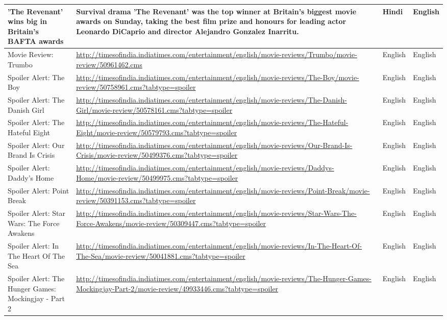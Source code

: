 \begin{itemize}
\begin{table}
\begin{center}
\begin{longtable}{|p{3cm}|p{7cm}|p{1.5cm}|p{1.5cm}|}
'The Revenant' wins big in Britain's BAFTA awards&  Survival drama 'The Revenant' was the top winner at Britain's biggest movie awards on Sunday, taking the best film prize and honours for leading actor Leonardo DiCaprio and director Alejandro Gonzalez Inarritu.&   Hindi&   English\\ \hline
  Movie Review: Trumbo&  \url{http://timesofindia.indiatimes.com/entertainment/english/movie-reviews/Trumbo/movie-review/50961462.cms} &   English&   English\\ \hline
  Spoiler Alert: The Boy& \url{http://timesofindia.indiatimes.com/entertainment/english/movie-reviews/The-Boy/movie-review/50758961.cms?tabtype=spoiler}&   English&   English\\ \hline
  Spoiler Alert: The Danish Girl&  \url{http://timesofindia.indiatimes.com/entertainment/english/movie-reviews/The-Danish-Girl/movie-review/50578161.cms?tabtype=spoiler}&   English&   English\\ \hline
  Spoiler Alert: The Hateful Eight&  \url{http://timesofindia.indiatimes.com/entertainment/english/movie-reviews/The-Hateful-Eight/movie-review/50579793.cms?tabtype=spoiler}&   English&   English\\ \hline
  Spoiler Alert: Our Brand Is Crisis&  \url{http://timesofindia.indiatimes.com/entertainment/english/movie-reviews/Our-Brand-Is-Crisis/movie-review/50499376.cms?tabtype=spoiler}&   English&   English        \\ \hline
  Spoiler Alert: Daddy's Home&  \url{http://timesofindia.indiatimes.com/entertainment/english/movie-reviews/Daddys-Home/movie-review/50499975.cms?tabtype=spoiler} &   English&   English\\ \hline
   Spoiler Alert: Point Break& \url{http://timesofindia.indiatimes.com/entertainment/english/movie-reviews/Point-Break/movie-review/50391153.cms?tabtype=spoiler} &  English&  English   \\ \hline
   Spoiler Alert: Star Wars: The Force Awakens&  \url{http://timesofindia.indiatimes.com/entertainment/english/movie-reviews/Star-Wars-The-Force-Awakens/movie-review/50309447.cms?tabtype=spoiler} &  English&  English\\ \hline
   Spoiler Alert: In The Heart Of The Sea&  \url{http://timesofindia.indiatimes.com/entertainment/english/movie-reviews/In-The-Heart-Of-The-Sea/movie-review/50041881.cms?tabtype=spoiler} &  English&  English\\ \hline
   Spoiler Alert: The Hunger Games: Mockingjay - Part 2&  \url{http://timesofindia.indiatimes.com/entertainment/english/movie-reviews/The-Hunger-Games-Mockingjay-Part-2/movie-review/49933446.cms?tabtype=spoiler} &  English&  English\\ \hline

\end{longtable}
\end{center}
\end{table}
\end{itemize}
